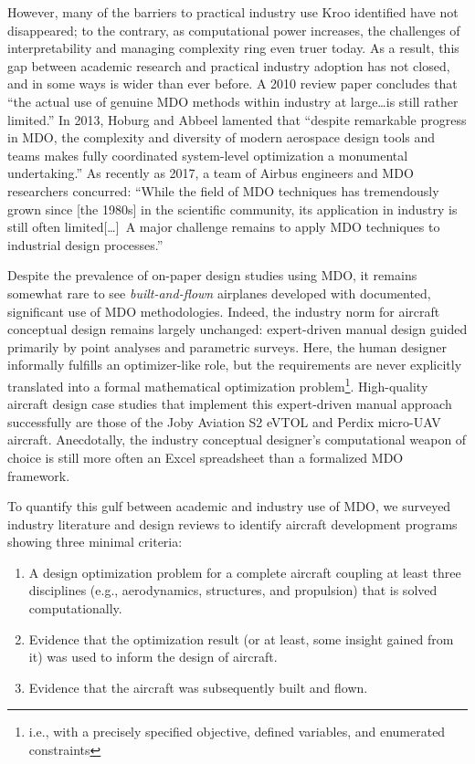 \documentclass[12pt,vi,oneside]{report}
\begin{document}
    However, many of the barriers to practical industry use Kroo identified have not disappeared; to the contrary, as computational power increases, the challenges of interpretability and managing complexity ring even truer today. As a result, this gap between academic research and practical industry adoption has not closed, and in some ways is wider than ever before. A 2010 review paper \cite{agte_mdo_2010} concludes that ``the actual use of genuine MDO methods within industry at large\dots is still rather limited.'' In 2013, Hoburg and Abbeel lamented that ``despite remarkable progress in MDO, the complexity and diversity of modern aerospace design tools and teams makes fully coordinated system-level optimization a monumental undertaking.'' \cite{hoburg_geometric_2014} As recently as 2017, a team of Airbus engineers and MDO researchers concurred: ``While the field of MDO techniques has tremendously grown since [the 1980s] in the scientific community, its application in industry is still often limited[\dots]\ A major challenge remains to apply MDO techniques to industrial design processes.'' \cite{gazaix_industrialization_2017}


    Despite the prevalence of on-paper design studies using MDO, it remains somewhat rare to see \textit{built-and-flown} airplanes developed with documented, significant use of MDO methodologies. Indeed, the industry norm for aircraft conceptual design remains largely unchanged: expert-driven manual design guided primarily by point analyses and parametric surveys. Here, the human designer informally fulfills an optimizer-like role, but the requirements are never explicitly translated into a formal mathematical optimization problem\footnote{i.e., with a precisely specified objective, defined variables, and enumerated constraints}. High-quality aircraft design case studies that implement this expert-driven manual approach successfully are those of the Joby Aviation S2 eVTOL \cite{stoll_conceptual_2014} and Perdix micro-UAV \cite{tao_design_2012} aircraft. Anecdotally, the industry conceptual designer's computational weapon of choice is still more often an Excel spreadsheet than a formalized MDO framework.

    To quantify this gulf between academic and industry use of MDO, we surveyed industry literature and design reviews to identify aircraft development programs showing three minimal criteria:
    \begin{enumerate}[noitemsep]
        \item A design optimization problem for a complete aircraft coupling at least three disciplines (e.g., aerodynamics, structures, and propulsion) that is solved computationally.
        \item Evidence that the optimization result (or at least, some insight gained from it) was used to inform the design of aircraft.
        \item Evidence that the aircraft was subsequently built and flown.
    \end{enumerate}
\end{document}
